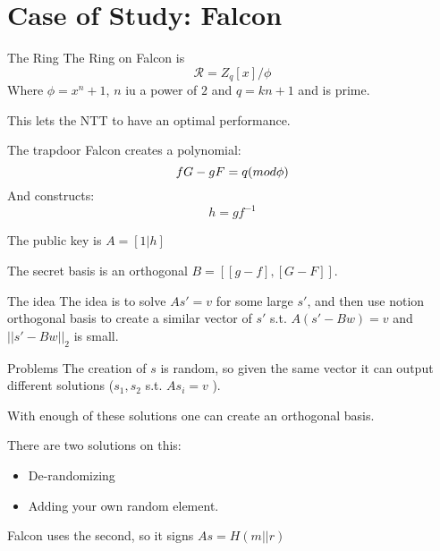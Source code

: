 \documentclass[presentation]{beamer}
\begin{document}
\section{Case of Study: Falcon}
\begin{frame}[label=the-ring]{The Ring}
  The Ring on Falcon is
  \[
    \mathcal R = Z_q[x] / \phi
  \]
  Where
  \(\phi = x^n + 1\), \(n\) iu a power of \(2\) and \(q = kn +
  1\) and is
  prime.

  This lets the NTT to have an optimal performance. 
\end{frame}
\begin{frame}[label=the-trapdoor]{The trapdoor}
  Falcon creates a polynomial:
  \[
    fG - gF = q \text({mod } \phi \text{)}
  \]
  And constructs:
  \[
    h = gf^{-1}
  \]

  The public key is \(A = [1 | h]\)

  The secret basis is an orthogonal \(B = [[g -f],[G -F]]\).

\end{frame}

\begin{frame}[label=the-idea]{The idea}
  The idea is to solve \(As' = v\) for some large \(s'\), and
  then use
  notion orthogonal basis to create a similar vector of \(s'\)
  s.t.
  \(A(s' -Bw) = v\) and \(||s' - Bw||_2\) is small.
\end{frame}
\begin{frame}[label=problems]{Problems}
  The creation of \(s\) is random, so given the same vector
  it \alert{can}
  output different solutions (\(s_1, s_2\) s.t. \(As_i = v\) ).

  With enough of these solutions one can create an orthogonal
  basis.

  There are two solutions on this:

  \begin{itemize}
    \item De-randomizing
    \item Adding your own random element.
  \end{itemize}

  Falcon uses the second, so it signs \(As = H(m || r)\)
\end{frame}
\end{document}

